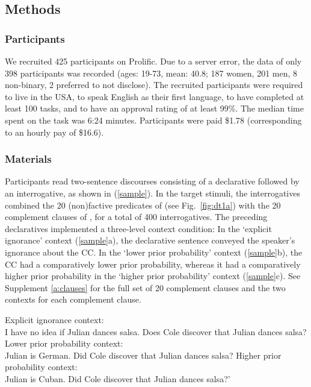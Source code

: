 \documentclass[11pt,fleqn]{article}
\newcommand{\6}{\mbox{$[\hspace*{-.6mm}[$}}
\newcommand{\9}{\mbox{$]\hspace*{-.6mm}]$}}
\begin{document}
\subsection{Methods}\label{s-methods}

\subsubsection{Participants}

We recruited 425 participants on Prolific. Due to a server error, the data of only 398 participants was recorded (ages: 19-73, mean: 40.8; 187 women, 201 men, 8 non-binary, 2 preferred to not disclose). The recruited participants were required to live in the USA, to speak English as their first language, to have completed at least 100 tasks, and to have an approval rating of at least 99\%. The median time spent on the task was 6:24 minutes. Participants were paid \$1.78 (corresponding to an hourly pay of \$16.6).


\subsubsection{Materials}

Participants read two-sentence discourses consisting of a declarative followed by an interrogative, as shown in (\ref{sample}). In the target stimuli, the interrogatives combined the 20 (non)factive predicates of \citealt{degen-tonhauser-language} (see Fig.~\ref{fig:dt1a}) with the 20 complement clauses of \citealt{degen-tonhauser-language}, for a total of 400 interrogatives. The preceding declaratives implemented a three-level context condition: In the `explicit ignorance' context (\ref{sample}a), the declarative sentence conveyed the speaker's ignorance about the CC. In the `lower prior probability' context (\ref{sample}b), the CC had a comparatively lower prior probability, whereas it had a comparatively higher prior probability in the `higher prior probability' context (\ref{sample}c). See Supplement \ref{a:clauses} for the full set of 20 complement clauses and the two contexts for each complement clause.

\begin{exe}
\ex\label{sample}
\begin{xlist}
\ex Explicit ignorance context: \\ I have no idea if Julian dances salsa. Does Cole discover that Julian dances salsa?
\ex Lower prior probability context: \\ Julian is German. Did Cole discover that Julian dances salsa?
\ex Higher prior probability context: \\ Julian is Cuban. Did Cole discover that Julian dances salsa?'
\end{xlist}
\end{exe}
\end{document}
